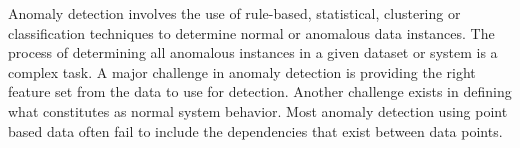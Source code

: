 

Anomaly detection involves the use of rule-based, statistical, clustering or classification techniques to determine normal or anomalous data instances. The process of determining all anomalous instances in a given dataset or system is a complex task. A major challenge in anomaly detection is providing the right feature set from the data to use for detection. Another challenge exists in defining what constitutes as normal system behavior. Most anomaly detection using point based data often fail to include the dependencies that exist between data points. 








